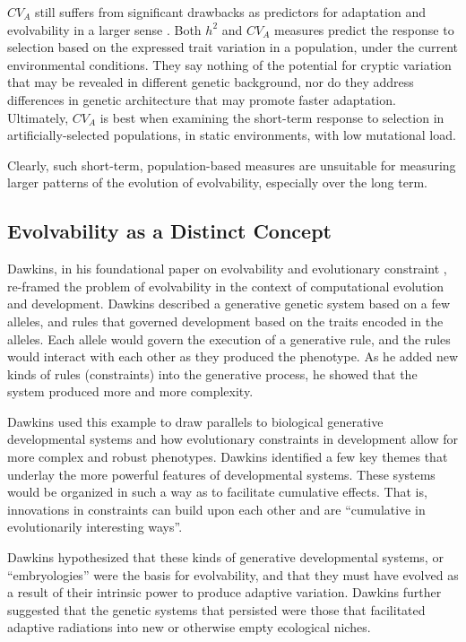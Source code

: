 \documentclass[PhD]{msu-thesis}
\begin{document}
$CV_A$ still suffers from significant drawbacks as predictors for adaptation and evolvability in a larger sense \cite{hansen_heritability_2011}. Both $h^2$ and $CV_A$ measures predict the response to selection based on the expressed trait variation in a population, under the current environmental conditions. They say nothing of the potential for cryptic variation that may be revealed in different genetic background, nor do they address differences in genetic architecture that may promote faster adaptation. Ultimately, $CV_A$ is best when examining the short-term response to selection in artificially-selected populations, in static environments, with low mutational load\cite{houle_comparing_1992}.

Clearly, such short-term, population-based measures are unsuitable for measuring larger patterns of the evolution of evolvability, especially over the long term.



\subsection{Evolvability as a Distinct Concept}

Dawkins, in his foundational paper on evolvability and evolutionary constraint \cite{dawkins_13_2003}, re-framed the problem of evolvability in the context of computational evolution and development. Dawkins described a generative genetic system based on a few alleles, and rules that governed development based on the traits encoded in the alleles. Each allele would govern the execution of a generative rule, and the rules would interact with each other as they produced the phenotype. As he added new kinds of rules (constraints) into the generative process, he showed that the system produced more and more complexity.

Dawkins used this example to draw parallels to biological generative developmental systems and how evolutionary constraints in development allow for more complex and robust phenotypes. Dawkins identified a few key themes that underlay the more powerful features of developmental systems. These systems would be organized in such a way as to facilitate cumulative effects. That is, innovations in constraints can build upon each other and are “cumulative in evolutionarily interesting ways”\cite{dawkins_13_2003}.

Dawkins hypothesized that these kinds of generative developmental systems, or “embryologies” were the basis for evolvability, and that they must have evolved as a result of their intrinsic power to produce adaptive variation. Dawkins further suggested that the genetic systems that persisted were those that facilitated adaptive radiations into new or otherwise empty ecological niches.
\end{document}
